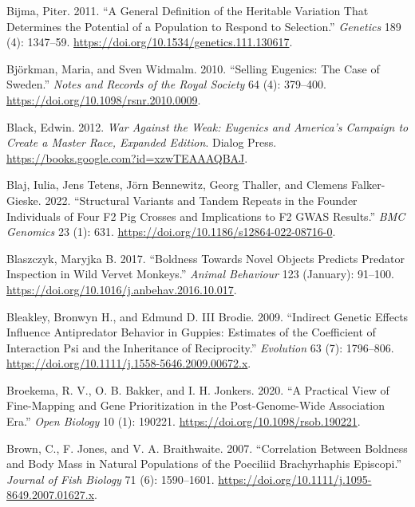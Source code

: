 \documentclass[
]{book}
\newlength{\cslhangindent}
\newlength{\cslentryspacingunit} %
\newenvironment{CSLReferences}[2] %
 {%
  \setlength{\parindent}{0pt}
  \ifodd #1
  \let\oldpar\par
  \def\par{\hangindent=\cslhangindent\oldpar}
  \fi
  \setlength{\parskip}{#2\cslentryspacingunit}
 }%
 {}
\begin{document}
\begin{CSLReferences}{1}{0}
\leavevmode{}%
Bijma, Piter. 2011. {``A {General Definition} of the {Heritable Variation That Determines} the {Potential} of a {Population} to {Respond} to {Selection}.''} \emph{Genetics} 189 (4): 1347--59. \url{https://doi.org/10.1534/genetics.111.130617}.

\leavevmode{}%
Björkman, Maria, and Sven Widmalm. 2010. {``Selling Eugenics: The Case of {Sweden}.''} \emph{Notes and Records of the Royal Society} 64 (4): 379--400. \url{https://doi.org/10.1098/rsnr.2010.0009}.

\leavevmode{}%
Black, Edwin. 2012. \emph{War {Against} the {Weak}: {Eugenics} and {America}'s {Campaign} to {Create} a {Master Race}, {Expanded Edition}}. {Dialog Press}. \url{https://books.google.com?id=xzwTEAAAQBAJ}.

\leavevmode{}%
Blaj, Iulia, Jens Tetens, Jörn Bennewitz, Georg Thaller, and Clemens Falker-Gieske. 2022. {``Structural Variants and Tandem Repeats in the Founder Individuals of Four {F2} Pig Crosses and Implications to {F2 GWAS} Results.''} \emph{BMC Genomics} 23 (1): 631. \url{https://doi.org/10.1186/s12864-022-08716-0}.

\leavevmode{}%
Blaszczyk, Maryjka B. 2017. {``Boldness Towards Novel Objects Predicts Predator Inspection in Wild Vervet Monkeys.''} \emph{Animal Behaviour} 123 (January): 91--100. \url{https://doi.org/10.1016/j.anbehav.2016.10.017}.

\leavevmode{}%
Bleakley, Bronwyn H., and Edmund D. III Brodie. 2009. {``Indirect Genetic Effects Influence Antipredator Behavior in Guppies: {Estimates} of the Coefficient of Interaction Psi and the Inheritance of Reciprocity.''} \emph{Evolution} 63 (7): 1796--806. \url{https://doi.org/10.1111/j.1558-5646.2009.00672.x}.

\leavevmode{}%
Broekema, R. V., O. B. Bakker, and I. H. Jonkers. 2020. {``A Practical View of Fine-Mapping and Gene Prioritization in the Post-Genome-Wide Association Era.''} \emph{Open Biology} 10 (1): 190221. \url{https://doi.org/10.1098/rsob.190221}.

\leavevmode{}%
Brown, C., F. Jones, and V. A. Braithwaite. 2007. {``Correlation Between Boldness and Body Mass in Natural Populations of the Poeciliid {Brachyrhaphis} Episcopi.''} \emph{Journal of Fish Biology} 71 (6): 1590--1601. \url{https://doi.org/10.1111/j.1095-8649.2007.01627.x}.


\end{CSLReferences}
\end{document}
